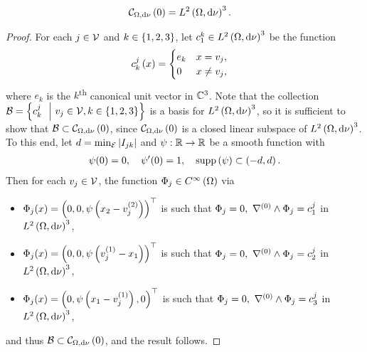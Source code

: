 \begin{prop} \label{prop:VertexCurlZero}
	\begin{align*}
		\mathcal{C}_{ \Omega, \mathrm{d}\nu}\left( 0 \right) &= L^{2}\left( \Omega,\mathrm{d}\nu \right)^3.
	\end{align*}
\end{prop}
\begin{proof}
	For each $j\in\mathcal{V}$ and $k\in\left\{ 1,2,3 \right\}$, let $c^k_1\in L^{2}\left( \Omega,\mathrm{d}\nu \right)^3$ be the function
	\begin{align*}
		c^j_k\left( x \right) &= \begin{cases} e_k & x=v_j, \\ 0 & x\neq v_j, \end{cases}
	\end{align*}
	where $e_k$ is the $k$\textsuperscript{th} canonical unit vector in $\mathbb{C}^3$.
	Note that the collection $\mathcal{B} = \left\{ c^j_k \ \ \middle\vert \  v_j\in\mathcal{V}, k\in\left\{ 1,2,3 \right\} \right\}$ is a basis for $L^{2}\left( \Omega,\mathrm{d}\nu \right)^3$, so it is sufficient to show that $\mathcal{B}\subset\mathcal{C}_{ \Omega, \mathrm{d}\nu}\left( 0 \right)$, since $\mathcal{C}_{ \Omega, \mathrm{d}\nu}\left( 0 \right)$ is a closed linear subspace of $L^{2}\left( \Omega,\mathrm{d}\nu \right)^3$.
	To this end, let $d=\min_{\mathcal{E}}\left\lvert I_{jk} \right\rvert$ and $\psi:\mathbb{R}\rightarrow\mathbb{R}$ be a smooth function with 
	\begin{align*}
		\psi(0) = 0, \quad \psi'(0) = 1, \quad \mathrm{supp}\left( \psi \right) \subset \left( -d,d \right).
	\end{align*}
	Then for each $v_j\in\mathcal{V}$, the function $\Phi_j\in C^{\infty}\left( \Omega \right)$ via 
	\begin{itemize}
		\item $\Phi_j(x) = \left( 0, 0, \psi\left( x_2 - v_j^{(2)} \right) \right)^\top$ is such that $\Phi_j = 0, \ \nabla^{(0)}\wedge\Phi_j = c^j_1$ in $L^{2}\left( \Omega,\mathrm{d}\nu \right)^3$,
		\item $\Phi_j(x) = \left( 0, 0, \psi\left( v_j^{(1)} - x_1 \right) \right)^\top$ is such that $\Phi_j = 0, \ \nabla^{(0)}\wedge\Phi_j = c^j_2$ in $L^{2}\left( \Omega,\mathrm{d}\nu \right)^3$,
		\item $\Phi_j(x) = \left( 0, \psi\left( x_1 - v_j^{(1)} \right), 0 \right)^\top$ is such that $\Phi_j = 0, \ \nabla^{(0)}\wedge\Phi_j = c^j_3$ in $L^{2}\left( \Omega,\mathrm{d}\nu \right)^3$,
	\end{itemize}
	and thus $\mathcal{B}\subset\mathcal{C}_{ \Omega, \mathrm{d}\nu}\left( 0 \right)$, and the result follows.
\end{proof}

